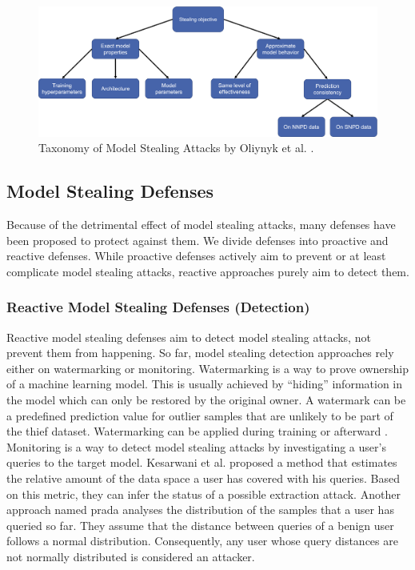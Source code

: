 \begin{figure} [ht]
  \centering
  \includegraphics[width=.9\linewidth]{images/MS_Taxonomy.png}
  \caption[Model Stealing Taxonomy]{Taxonomy of Model Stealing Attacks by Oliynyk et al. \cite{oliynyk2022know}.}
  \label{fig:ModelStealing:Taxonomy}
\end{figure}


\subsection{Model Stealing Defenses}
\label{sec:ModelStealing:Defenses}
Because of the detrimental effect of model stealing attacks, many defenses have been proposed to protect against them. We divide defenses into proactive and
reactive defenses. While proactive defenses actively aim to prevent or at least complicate model stealing attacks, reactive approaches purely aim to detect them.

\subsubsection{Reactive Model Stealing Defenses (Detection)}
\label{sec:ModelStealing:Defenses:Detection}
Reactive model stealing defenses aim to detect model stealing attacks, not prevent them from happening. So far, model stealing detection approaches
rely either on watermarking or monitoring. Watermarking is a way to prove ownership of a machine learning model. This is usually achieved by \enquote{hiding} information
in the model which can only be restored by the original owner. A watermark can be a predefined prediction value for outlier samples that are unlikely to be part of the
thief dataset. Watermarking can be applied during training \cite{zhang2018protecting} or afterward \cite{szyller2021dawn}. Monitoring is a way to detect model stealing
attacks by investigating a user's queries to the target model. Kesarwani et al. \cite{kesarwani2018model} proposed a method that estimates the relative amount of the
data space a user has covered with his queries. Based on this metric, they can infer the status of a possible extraction attack. Another approach named \gls{prada} 
\cite{juuti2019prada} analyses the distribution of the samples that a user has queried so far. They assume that the distance between queries of a benign user follows
a normal distribution. Consequently, any user whose query distances are not normally distributed is considered an attacker. \par

